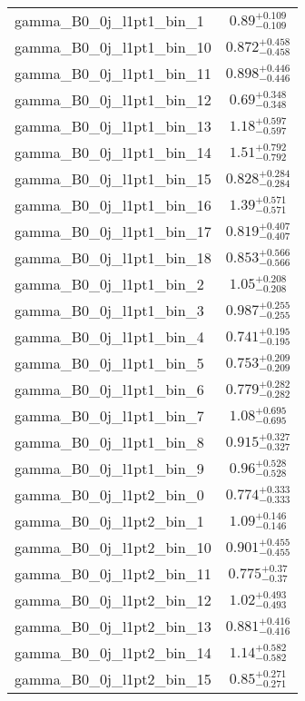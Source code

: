 \begin{tabular}{|l|c|}
gamma\_B0\_0j\_l1pt1\_bin\_1 & $0.89^{+0.109}_{-0.109}$ \\
gamma\_B0\_0j\_l1pt1\_bin\_10 & $0.872^{+0.458}_{-0.458}$ \\
gamma\_B0\_0j\_l1pt1\_bin\_11 & $0.898^{+0.446}_{-0.446}$ \\
gamma\_B0\_0j\_l1pt1\_bin\_12 & $0.69^{+0.348}_{-0.348}$ \\
gamma\_B0\_0j\_l1pt1\_bin\_13 & $1.18^{+0.597}_{-0.597}$ \\
gamma\_B0\_0j\_l1pt1\_bin\_14 & $1.51^{+0.792}_{-0.792}$ \\
gamma\_B0\_0j\_l1pt1\_bin\_15 & $0.828^{+0.284}_{-0.284}$ \\
gamma\_B0\_0j\_l1pt1\_bin\_16 & $1.39^{+0.571}_{-0.571}$ \\
gamma\_B0\_0j\_l1pt1\_bin\_17 & $0.819^{+0.407}_{-0.407}$ \\
gamma\_B0\_0j\_l1pt1\_bin\_18 & $0.853^{+0.566}_{-0.566}$ \\
gamma\_B0\_0j\_l1pt1\_bin\_2 & $1.05^{+0.208}_{-0.208}$ \\
gamma\_B0\_0j\_l1pt1\_bin\_3 & $0.987^{+0.255}_{-0.255}$ \\
gamma\_B0\_0j\_l1pt1\_bin\_4 & $0.741^{+0.195}_{-0.195}$ \\
gamma\_B0\_0j\_l1pt1\_bin\_5 & $0.753^{+0.209}_{-0.209}$ \\
gamma\_B0\_0j\_l1pt1\_bin\_6 & $0.779^{+0.282}_{-0.282}$ \\
gamma\_B0\_0j\_l1pt1\_bin\_7 & $1.08^{+0.695}_{-0.695}$ \\
gamma\_B0\_0j\_l1pt1\_bin\_8 & $0.915^{+0.327}_{-0.327}$ \\
gamma\_B0\_0j\_l1pt1\_bin\_9 & $0.96^{+0.528}_{-0.528}$ \\
gamma\_B0\_0j\_l1pt2\_bin\_0 & $0.774^{+0.333}_{-0.333}$ \\
gamma\_B0\_0j\_l1pt2\_bin\_1 & $1.09^{+0.146}_{-0.146}$ \\
gamma\_B0\_0j\_l1pt2\_bin\_10 & $0.901^{+0.455}_{-0.455}$ \\
gamma\_B0\_0j\_l1pt2\_bin\_11 & $0.775^{+0.37}_{-0.37}$ \\
gamma\_B0\_0j\_l1pt2\_bin\_12 & $1.02^{+0.493}_{-0.493}$ \\
gamma\_B0\_0j\_l1pt2\_bin\_13 & $0.881^{+0.416}_{-0.416}$ \\
gamma\_B0\_0j\_l1pt2\_bin\_14 & $1.14^{+0.582}_{-0.582}$ \\
gamma\_B0\_0j\_l1pt2\_bin\_15 & $0.85^{+0.271}_{-0.271}$ \\

\end{tabular}
